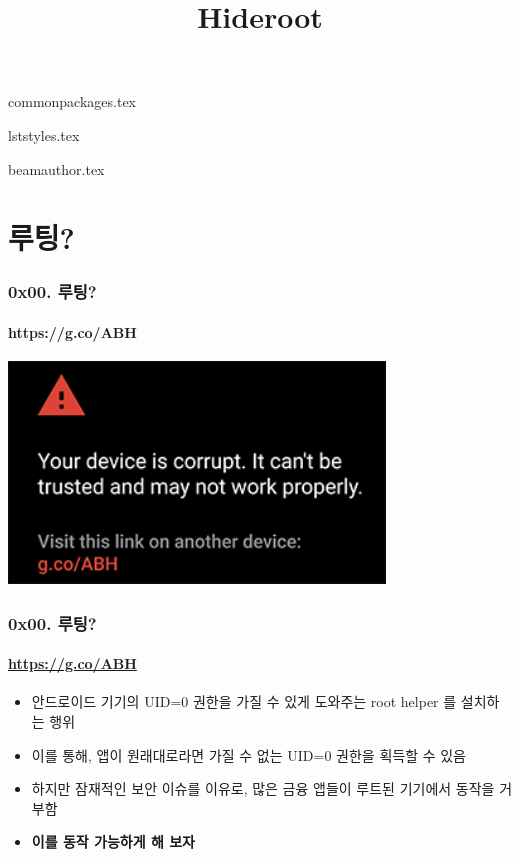 

 {commonpackages.tex}

\setsansfont {Noto Sans CJK KR}
\setmainfont {Noto Sans CJK KR}
\setmonofont[Scale=0.8]{DejaVu Sans Mono}

 {lststyles.tex}

\hypersetup {
  colorlinks, linkcolor=blue
}

\title {Hideroot}
 {beamauthor.tex}




\begin{frame}
  \titlepage
\end{frame}


\section[Section]{루팅?}
\begin{frame}
  \frametitle{0x00. 루팅?}
  \framesubtitle{https://g.co/ABH}

  \begin{center}
    \includegraphics [width=100mm]{img/corrupted_nexus.png}
  \end{center}
\end{frame}

\begin{frame}
  \frametitle{0x00. 루팅?}
  \framesubtitle{\url{https://g.co/ABH}}

  \begin{itemize}
  \item 안드로이드 기기의 UID=0 권한을 가질 수 있게 도와주는 root helper 를 설치하는 행위
  \item<2-> 이를 통해, 앱이 원래대로라면 가질 수 없는 UID=0 권한을 획득할 수 있음
  \item<3-> 하지만 잠재적인 보안 이슈를 이유로, 많은 금융 앱들이 루트된 기기에서 동작을 거부함
  \item<4-> \textbf{이를 동작 가능하게 해 보자}
  \end{itemize}
\end{frame}
 
